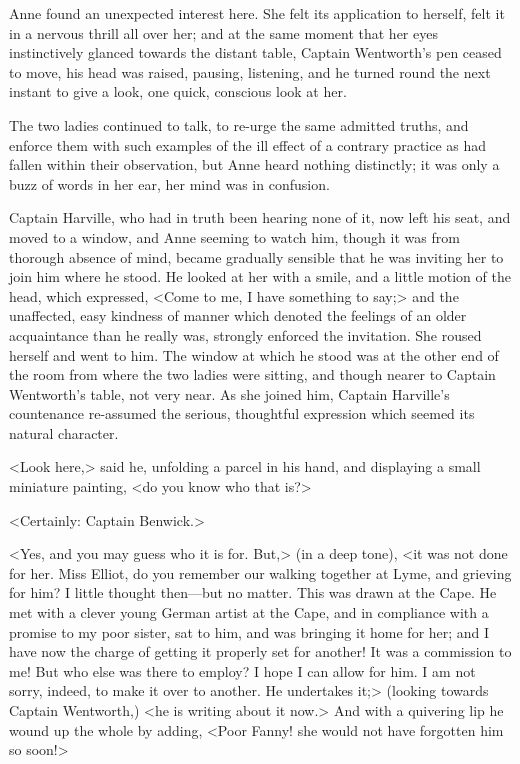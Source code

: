 Anne found an unexpected interest here. She felt its application to herself, felt it in a nervous thrill all over her; and at the same moment that her eyes instinctively glanced towards the distant table, Captain Wentworth's pen ceased to move, his head was raised, pausing, listening, and he turned round the next instant to give a look, one quick, conscious look at her.

The two ladies continued to talk, to re-urge the same admitted truths, and enforce them with such examples of the ill effect of a contrary practice as had fallen within their observation, but Anne heard nothing distinctly; it was only a buzz of words in her ear, her mind was in confusion.

Captain Harville, who had in truth been hearing none of it, now left his seat, and moved to a window, and Anne seeming to watch him, though it was from thorough absence of mind, became gradually sensible that he was inviting her to join him where he stood. He looked at her with a smile, and a little motion of the head, which expressed, <Come to me, I have something to say;> and the unaffected, easy kindness of manner which denoted the feelings of an older acquaintance than he really was, strongly enforced the invitation. She roused herself and went to him. The window at which he stood was at the other end of the room from where the two ladies were sitting, and though nearer to Captain Wentworth's table, not very near. As she joined him, Captain Harville's countenance re-assumed the serious, thoughtful expression which seemed its natural character.

<Look here,> said he, unfolding a parcel in his hand, and displaying a small miniature painting, <do you know who that is?>

<Certainly: Captain Benwick.>

<Yes, and you may guess who it is for. But,> (in a deep tone), <it was not done for her. Miss Elliot, do you remember our walking together at Lyme, and grieving for him? I little thought then—but no matter. This was drawn at the Cape. He met with a clever young German artist at the Cape, and in compliance with a promise to my poor sister, sat to him, and was bringing it home for her; and I have now the charge of getting it properly set for another! It was a commission to me! But who else was there to employ? I hope I can allow for him. I am not sorry, indeed, to make it over to another. He undertakes it;> (looking towards Captain Wentworth,) <he is writing about it now.> And with a quivering lip he wound up the whole by adding, <Poor Fanny! she would not have forgotten him so soon!>

